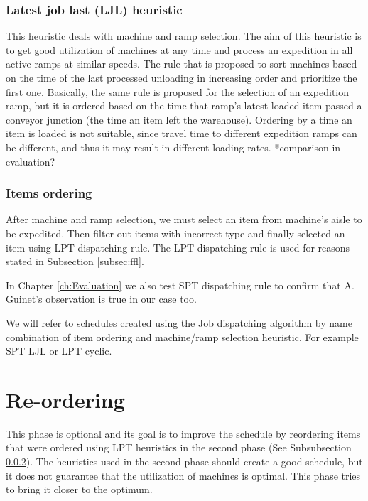 \documentclass{ctuthesis}
\begin{document}
\subsubsection{Latest job last (LJL) heuristic }
This heuristic deals with machine and ramp selection.
The aim of this heuristic is to get good utilization of machines at any time and process an expedition in all active ramps at similar speeds. The rule that is proposed to sort machines based on the time of the last processed unloading in increasing order and prioritize the first one. 
Basically, the same rule is proposed for the selection of an expedition ramp, but it is ordered based on the time that ramp's latest loaded item passed a conveyor junction (the time an item left the warehouse). Ordering by a time an item is loaded is not suitable, since travel time to different expedition ramps can be different, and thus it may result in different loading rates. *comparison in evaluation?

\subsubsection{Items ordering}
\label{subsubsec:itemsordering}

After machine and ramp selection, we must select an item from machine's aisle to be expedited. Then filter out items with incorrect type and finally selected an item using LPT dispatching rule. The LPT dispatching rule is used for reasons stated in Subsection \ref{subsec:ffl}.

In Chapter \ref{ch:Evaluation} we also test SPT dispatching rule to confirm that A. Guinet's observation is true in our case too. 

We will refer to schedules created using the Job dispatching algorithm by name combination of item ordering and machine/ramp selection heuristic. For example SPT-LJL or LPT-cyclic.

\section{Re-ordering}

This phase is optional and its goal is to improve the schedule by reordering items that were ordered using LPT heuristics in the second phase (See Subsubsection \ref{subsubsec:itemsordering}). The heuristics used in the second phase should create a good schedule, but it does not guarantee that the utilization of machines is optimal. This phase tries to bring it closer to the optimum.
\end{document}
